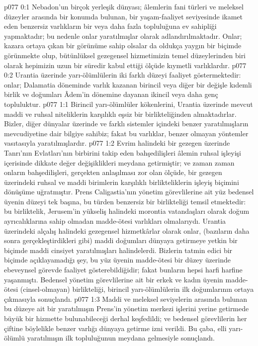 \vs p077 0:1 Nebadon’un birçok yerleşik dünyası; âlemlerin fani türleri ve meleksel düzeyler arasında bir konumda bulunan, bir yaşam\hyp{}faaliyet seviyesinde ikamet eden benzersiz varlıkların bir veya daha fazla topluluğuna ev sahipliği yapmaktadır; bu nedenle onlar  yaratılmışlar olarak adlandırılmaktadır. Onlar; kazara ortaya çıkan bir görünüme sahip olsalar da oldukça yaygın bir biçimde görünmekte olup, bütünlüksel gezegensel hizmetimizin temel düzeylerinden biri olarak hepimizin uzun bir süredir kabul ettiği ölçüde kıymetli varlıklardır.
\vs p077 0:2 Urantia üzerinde yarı\hyp{}ölümlülerin iki farklı düzeyi faaliyet göstermektedir: onlar; Dalamatia döneminde varlık kazanan birincil veya diğer bir değişle kıdemli birlik ve doğumları Âdem’in dönemine dayanan ikincil veya daha genç topluluktur.
\vs p077 1:1 Birincil yarı\hyp{}ölümlüler kökenlerini, Urantia üzerinde mevcut maddi ve ruhsal niteliklerin karşılıklı eşsiz bir birlikteliğinden almaktadırlar. Bizler, diğer dünyalar üzerinde ve farklı sistemler içindeki benzer yaratılmışların mevcudiyetine dair bilgiye sahibiz; fakat bu varlıklar, benzer olmayan yöntemler vasıtasıyla yaratılmışlardır.
\vs p077 1:2 Evrim halindeki bir gezegen üzerinde Tanrı’nın Evlatları’nın birbirini takip eden bahşedilişleri âlemin ruhsal işleyişi içerisinde dikkate değer değişiklikleri meydana getirmiştir; ve zaman zaman onların bahşedilişleri, gerçekten anlaşılması zor olan ölçüde, bir gezegen üzerindeki ruhsal ve maddi birimlerin karşılıklı birlikteliklerin işleyiş biçimini dönüşüme uğratmıştır. Prens Caligastia’nın yönetim görevlilerine ait yüz bedensel üyenin düzeyi tek başına, bu türden benzersiz bir birlikteliği temsil etmektedir: bu birliktelik, Jerusem’in yükseliş halindeki morontia vatandaşları olarak doğum ayrıcalıklarına sahip olmadan madde\hyp{}ötesi varlıkları olmalarıydı. Urantia üzerindeki alçalış halindeki gezegensel hizmetkârlar olarak onlar, (bazıların daha sonra gerçekleştirdikleri gibi) maddi doğumları dünyaya getirmeye yetkin bir biçimde maddi cinsiyet yaratılmışları halindelerdi. Bizlerin tatmin edici bir biçimde açıklayamadığı şey, bu yüz üyenin madde\hyp{}ötesi bir düzey üzerinde ebeveynsel görevde faaliyet gösterebildiğidir; fakat bunların hepsi harfi harfine yaşanmıştı. Bedensel yönetim görevlilerine ait bir erkek ve kadın üyenin madde\hyp{}ötesi (cinsel\hyp{}olmayan) birlikteliği, birincil yarı\hyp{}ölümlülerin ilk doğumlarının ortaya çıkmasıyla sonuçlandı.
\vs p077 1:3 Maddi ve meleksel seviyelerin arasında bulunan bu düzeye ait bir yaratılmışın Prens’in yönetim merkezi işlerini yerine getirmede büyük bir hizmette bulunabileceği derhal keşfedildi; ve bedensel görevlilerin her çiftine böylelikle benzer varlığı dünyaya getirme izni verildi. Bu çaba, elli yarı\hyp{}ölümlü yaratılmışın ilk topluluğunun meydana gelmesiyle sonuçlandı.
